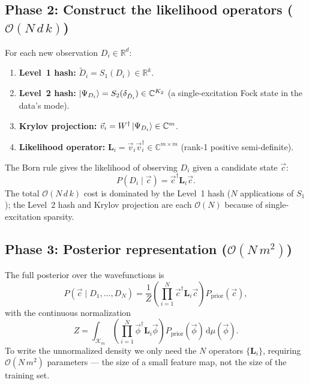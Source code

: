 \documentclass[11pt, a4paper]{article}
\newcommand{\Kry}{\mathcal{K}}
\newcommand{\Rset}{\mathbb{R}}
\newcommand{\Cset}{\mathbb{C}}
\begin{document}
\subsection{Phase 2: Construct the likelihood operators ($\mathcal{O}(N\,d\,k)$)}

For each new observation $D_i\in\Rset^d$:
\begin{enumerate}
\item \textbf{Level~1 hash:} $\tilde D_i=S_1(D_i)\in\Rset^k$.
\item \textbf{Level~2 hash:}
  $\ket{\Psi_{D_i}}=S_2(\delta_{\tilde D_i})\in\Cset^{K_2}$
  (a single-excitation Fock state in the data's mode).
\item \textbf{Krylov projection:}
  $\vec v_i=W^\dagger\ket{\Psi_{D_i}}\in\Cset^m$.
\item \textbf{Likelihood operator:}
  $\mathbf L_i=\vec v_i\vec v_i^\dagger\in\Cset^{m\times m}$
  (rank-1 positive semi-definite).
\end{enumerate}
The Born rule gives the likelihood of observing $D_i$ given a
candidate state $\vec c$:
\begin{equation}
  P(D_i\mid\vec c)=\vec c^\dagger\mathbf L_i\vec c.
  \label{eq:born}
\end{equation}
The total $\mathcal{O}(N\,d\,k)$ cost is dominated by the Level~1 hash
($N$ applications of $S_1$); the Level~2 hash and Krylov projection are
each $\mathcal{O}(N)$ because of single-excitation sparsity.

\subsection{Phase 3: Posterior representation ($\mathcal{O}(N\,m^2)$)}

The full posterior over the wavefunctions is
\begin{equation}
  P(\vec c\mid D_1,\dots,D_N)=\frac{1}{Z}
  \left(\prod_{i=1}^{N}\vec c^\dagger\mathbf L_i\vec c\right)
  P_{\mathrm{prior}}(\vec c),
  \label{eq:posterior}
\end{equation}
with the continuous normalization
\begin{equation}
  Z=\int_{\Kry_m}\left(\prod_{i=1}^N\vec\phi^\dagger\mathbf L_i\vec\phi\right)
  P_{\mathrm{prior}}(\vec\phi)\,\mathrm{d}\mu(\vec\phi).
  \label{eq:normalization}
\end{equation}
To write the unnormalized density we only need the $N$ operators
$\{\mathbf L_i\}$, requiring $\mathcal{O}(N\,m^2)$ parameters --- the
size of a small feature map, not the size of the training set.
\end{document}

